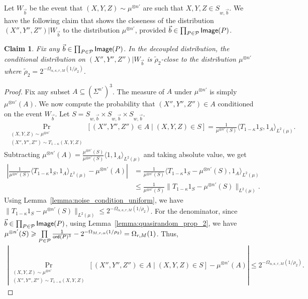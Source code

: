 \documentclass[11pt]{article}
\newtheorem{claim}[thm]{Claim}
\newcommand\card[1]{\left| {#1} \right|}
\newcommand\norm[1]{\| #1 \|}
\renewcommand\geq{\geqslant}
\renewcommand\leq{\leqslant}
\newcommand{\V}[1]{{#1}}
\begin{document}
Let $W_{\vec{b}}$ be the event that $(X, Y, Z)\sim \mu^{\otimes n'}$ are such that $X, Y, Z\in S_{\V w, \vec{b}}$. We have the following claim that shows the closeness of the distribution $(X'', Y'', Z'')|W_{\vec{b}}$ to the distribution $\mu^{\otimes n'}$, provided $\vec{b} \in \prod_{P\in \mathcal{P}} {\sf Image}(P)$.
\begin{claim}\label{claim:closeness}
Fix any $\vec{b}\in  \prod_{P\in \mathcal{P}} {\sf Image}(P)$. In the decoupled distribution, the conditional distribution on $(X'', Y'', Z'')|W_{\vec{b}}$ is $\tilde{\rho}_2$-close to the distribution $\mu^{\otimes n'}$ where $\tilde{\rho}_2 =  2^{-\Omega_{\alpha, \kappa, r, M}(1/\rho_2)}$.
\end{claim}
\begin{proof}
    Fix any subset $A\subseteq (\Sigma^{n'})^3$. The measure of $A$ under $\mu^{\otimes n'}$ is simply $\mu^{\otimes n'}(A)$. We now compute the probability that  $(X'', Y'', Z'')\in A$ conditioned on the event $W_{\vec{b}}$. Let $S = S_{\V w, \vec{b}} \times S_{\V w, \vec{b}}\times S_{\V w, \vec{b}}$.
    \begin{align*}
        \Pr_{\substack{(X, Y, Z)\sim \mu^{\otimes n'}\\ (X'', Y'', Z'')\sim T_{1-\kappa}(X, Y, Z)}}\left[(X'', Y'', Z'')\in A \mid (X, Y, Z) \in S\right] = \frac{1}{\mu^{\otimes n'}(S)} \langle T_{1-\kappa}1_S, 1_A \rangle_{L^2(\mu)}.
    \end{align*}
    Subtracting $\mu^{\otimes n'}(A) = \frac{\mu^{\otimes n'}(S)}{\mu^{\otimes n'}(S)} \langle1, 1_A \rangle_{L^2(\mu)}$ and taking absolute value, we get
    \begin{align*}
        \card{\frac{1}{\mu^{\otimes n'}(S)} \langle T_{1-\kappa}1_S, 1_A \rangle_{L^2(\mu)} - \mu^{\otimes n'}(A)} &= \frac{1}{\mu^{\otimes n'}(S)}\langle T_{1-\kappa}1_S -\mu^{\otimes n'}(S) , 1_A\rangle_{L^2(\mu)}\\
        &\leq \frac{1}{\mu^{\otimes n'}(S)}\norm{T_{1-\kappa}1_S -\mu^{\otimes n'}(S)}_{L^2(\mu)}.
    \end{align*}
    Using Lemma~\ref{lemma:noise_condition_uniform}, we have $\norm{T_{1-\kappa}1_S -\mu^{\otimes n'}(S)}_{L^2(\mu)}\leq 2^{-\Omega_{\alpha, \kappa, r, M}(1/\rho_2)}$. For the denominator, since $\vec{b}\in  \prod_{P\in \mathcal{P}} {\sf Image}(P)$, using Lemma~\ref{lemma:quasirandom_prop_2}, we have $\mu^{\otimes n'}(S) \geq \prod\limits_{P\in\mathcal{P}}\frac{1}{{\sf ord}(P)^3}-2^{-\Omega_{M,r,\alpha}(1/\rho_2)} = \Omega_{r, M}(1)$. Thus,
     \begin{align*}
        \card{\Pr_{\substack{(X, Y, Z)\sim \mu^{\otimes n'}\\ (X'', Y'', Z'')\sim T_{1-\kappa}(X, Y, Z)}}\left[(X'', Y'', Z'')\in A \mid (X, Y, Z) \in S\right] - \mu^{\otimes n'}(A)} \leq  2^{-\Omega_{\alpha, \kappa, r, M}(1/\rho_2)}.
    \end{align*}
\end{proof}
\end{document}
